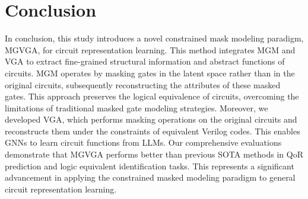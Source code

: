 \section{Conclusion}
\label{sec:conclu}
In conclusion, this study introduces a novel constrained mask modeling paradigm, MGVGA, for circuit representation learning. 
This method integrates MGM and VGA to extract fine-grained structural information and abstract functions of circuits. 
MGM operates by masking gates in the latent space rather than in the original circuits, subsequently reconstructing the attributes of these masked gates. 
This approach preserves the logical equivalence of circuits, overcoming the limitations of traditional masked gate modeling strategies. 
Moreover, we developed VGA, which performs masking operations on the original circuits and reconstructs them under the constraints of equivalent Verilog codes. 
This enables GNNs to learn circuit functions from LLMs. 
Our comprehensive evaluations demonstrate that MGVGA performs better than previous SOTA methods in QoR prediction and logic equivalent identification tasks. 
This represents a significant advancement in applying the constrained masked modeling paradigm to general circuit representation learning. 
